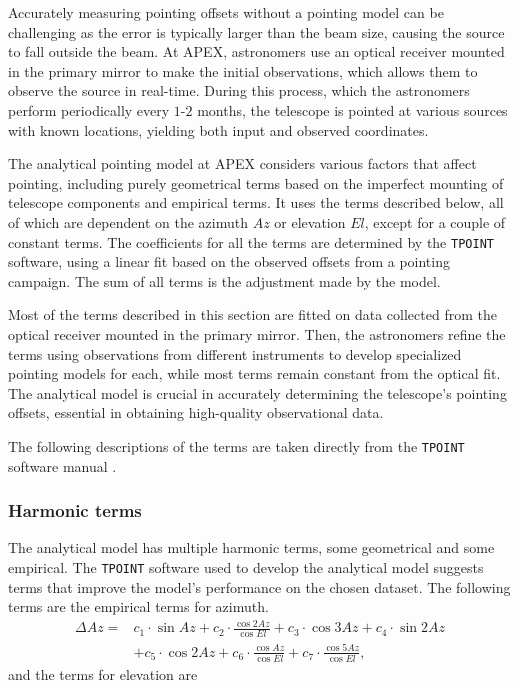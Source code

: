 Accurately measuring pointing offsets without a pointing model can be challenging as the error is typically larger than the beam size, causing the source to fall outside the beam. At APEX,
astronomers use an optical receiver mounted in the primary mirror to make the initial observations, which allows them to observe the source in real-time.
During this process, which the astronomers perform periodically every $1$-$2$ months, the telescope is pointed at various sources with known locations, yielding both input and observed coordinates.

The analytical pointing model at APEX considers various factors that affect pointing, including purely geometrical terms based on the imperfect mounting of telescope components and empirical terms.
It uses the terms described below, all of which are dependent on the azimuth $Az$ or elevation $El$, except for a couple of constant terms.
The coefficients for all the terms are determined by the \texttt{TPOINT} software, using a linear fit based on the observed offsets from a pointing campaign.
The sum of all terms is the adjustment made by the model.

Most of the terms described in this section are fitted on data collected from the optical receiver mounted in the primary mirror.
Then, the astronomers refine the terms using observations from different instruments to develop specialized pointing models for each, while most terms remain constant from the optical fit.
The analytical model is crucial in accurately determining the telescope's pointing offsets, essential in obtaining high-quality observational data.

The following descriptions of the terms are taken directly from the \texttt{TPOINT} software manual \cite{tpoint_manual}.

\subsubsection{Harmonic terms}
The analytical model has multiple harmonic terms, some geometrical and some empirical.
The \texttt{TPOINT} software used to develop the analytical model suggests terms that improve the model's performance on the chosen dataset.
The following terms are the empirical terms for azimuth.
\begin{align}\label{eq:analytical_az}
    \Delta Az =&  c_1 \cdot \sin{Az} + c_2 \cdot \frac{\cos{2Az}}{\cos{El}} + c_3 \cdot \cos{3Az} + c_4 \cdot \sin{2Az} \\
    &+ c_5 \cdot \cos{2Az} + c_6 \cdot \frac{\cos{Az}}{\cos{El}} + c_7 \cdot \frac{\cos{5Az}}{\cos{El}},
\end{align}
and the terms for elevation are

